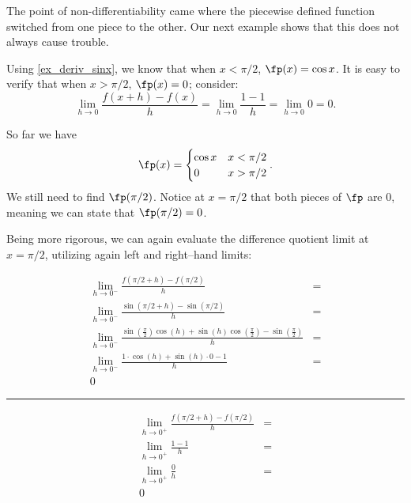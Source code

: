 The point of non-differentiability came where the piecewise defined function switched from one piece to the other. Our next example shows that this does not always cause trouble.\bigskip

{Using \autoref{ex_deriv_sinx}, we know that when $x<\pi/2$, $\fp(x) = \cos x$. It is easy to verify that when $x>\pi/2$, $\fp(x) = 0$; consider:
\[
 \lim_{h\to0}\frac{f(x+h) - f(x)}{h}
 = \lim_{h\to0}\frac{1-1}{h} = \lim_{h\to0}0 =0.
\]

So far we have $$\fp(x) = \begin{cases}\cos x & x<\pi/2\\ 0 & x>\pi/2\end{cases}.$$ We still need to find $\fp(\pi/2)$. Notice at $x=\pi/2$ that both pieces of $\fp$ are 0, meaning we can state that $\fp(\pi/2)=0$. 

Being more rigorous, we can again evaluate the difference quotient limit at $x=\pi/2$, utilizing again left and right--hand limits:\\

\small
\noindent\begin{minipage}{.59\linewidth}
\begin{align*}
\lim_{h\to0^-}\frac{f(\pi/2+h)-f(\pi/2)}{h} &=\\
\lim_{h\to0^-}\frac{\sin(\pi/2+h)-\sin(\pi/2)}{h}&=\\
\lim_{h\to0^-}{ \frac{\sin(\frac{\pi}{2})\cos(h)+\sin(h)\cos(\frac{\pi}{2})-\sin(\frac{\pi}{2})}{h}}&=\\
\lim_{h\to0^-}\frac{1\cdot\cos(h)+\sin(h)\cdot 0-1}{h} &=\\
0
\end{align*}
\end{minipage}
\begin{minipage}{1pt}
 \rule{.5pt}{100pt}
\end{minipage}
\begin{minipage}{.39\linewidth}
\begin{align*}
\lim_{h\to0^+}\frac{f(\pi/2+h)-f(\pi/2)}{h} &=\\
\lim_{h\to0^+}\frac{1-1}{h}&=\\
\lim_{h\to0^+}\frac{0}{h}&=\\
0&\\
\phantom{0}\\
\phantom{0}
\end{align*}
\end{minipage}
\normalsize

}
